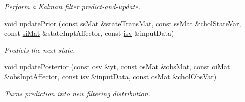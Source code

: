 \begin{DoxyCompactItemize}
\begin{DoxyCompactList}\small\item\em Perform a Kalman filter predict-\/and-\/update. \end{DoxyCompactList}\item 
void \hyperlink{classkalman_abcc37953cff8f05d73895f95c37b9892}{update\+Prior} (const \hyperlink{classkalman_a9d46100ff92b06fad10f14d722a5ce94}{ss\+Mat} \&state\+Trans\+Mat, const \hyperlink{classkalman_a9d46100ff92b06fad10f14d722a5ce94}{ss\+Mat} \&chol\+State\+Var, const \hyperlink{classkalman_a8311e2213ec968dc595add5f6933d091}{si\+Mat} \&state\+Inpt\+Affector, const \hyperlink{classkalman_ab085cc62231ff087133f8b24e052a36e}{isv} \&input\+Data)
\begin{DoxyCompactList}\small\item\em Predicts the next state. \end{DoxyCompactList}\item 
void \hyperlink{classkalman_a604946f8f1a7d5b3cdf82087f7b34c05}{update\+Posterior} (const \hyperlink{classkalman_a59427bc89132911a2afb9f42ebff0b28}{osv} \&yt, const \hyperlink{classkalman_a092ff444bcb70f49972e645bc993fd79}{os\+Mat} \&obs\+Mat, const \hyperlink{classkalman_a2a9c411927e8ae35144b2c40dac2f3d1}{oi\+Mat} \&obs\+Inpt\+Affector, const \hyperlink{classkalman_ab085cc62231ff087133f8b24e052a36e}{isv} \&input\+Data, const \hyperlink{classkalman_a092ff444bcb70f49972e645bc993fd79}{os\+Mat} \&chol\+Obs\+Var)
\begin{DoxyCompactList}\small\item\em Turns prediction into new filtering distribution. \end{DoxyCompactList}\end{DoxyCompactItemize}
